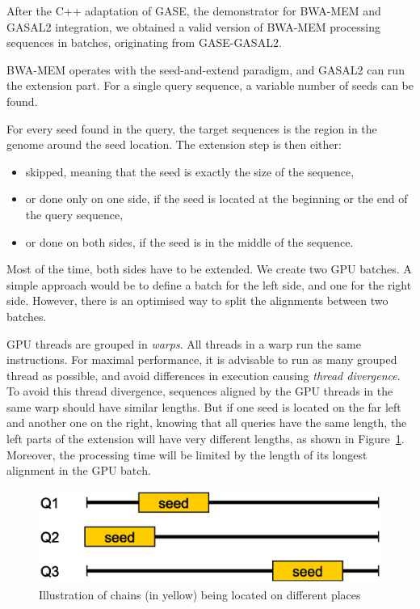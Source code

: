 After the C++ adaptation of GASE, the demonstrator for BWA-MEM and GASAL2 integration, we obtained a valid version of BWA-MEM processing sequences in batches, originating from GASE-GASAL2.

BWA-MEM operates with the seed-and-extend paradigm, and GASAL2 can run the extension part. For a single query sequence, a variable number of seeds can be found. 

For every seed found in the query, the target sequences is the region in the genome around the seed location. The extension step is then either:

\begin{itemize}
	\item skipped, meaning that the seed is exactly the size of the sequence,
	\item or done only on one side, if the seed is located at the beginning or the end of the query sequence,
	\item or done on both sides, if the seed is in the middle of the sequence.
\end{itemize}

Most of the time, both sides have to be extended. We create two GPU batches. A simple approach would be to define a batch for the left side, and one for the right side. However, there is an optimised way to split the alignments between two batches.

GPU threads are grouped in \emph{warps}. All threads in a warp run the same instructions. For maximal performance, it is advisable to run as many grouped thread as possible, and avoid differences in execution causing \emph{thread divergence}. To avoid this thread divergence, sequences aligned by the GPU threads in the same warp should have similar lengths. But if one seed is located on the far left and another one on the right, knowing that all queries have the same length, the left parts of the extension will have very different lengths, as shown in Figure~\ref{fig:seds-different-chains}. Moreover, the processing time will be limited by the length of its longest alignment in the GPU batch.
\begin{figure}[h!]
	\centering
	\includegraphics[width=0.7\linewidth]{seds-different-chains}
	\caption{Illustration of chains (in yellow) being located on different places}
	\label{fig:seds-different-chains}
\end{figure}

